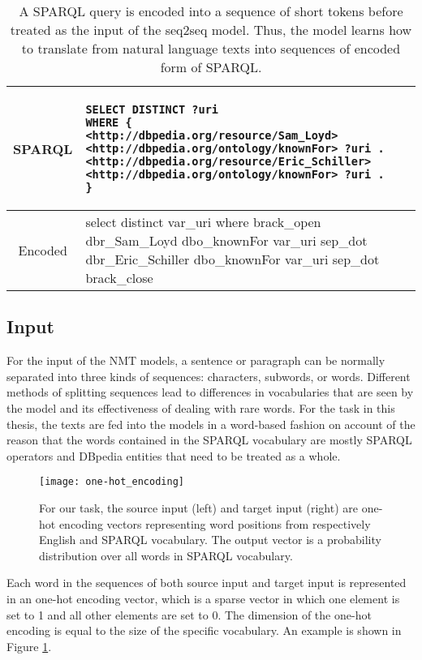 \begin{table}[h]
\begin{tabular}{c | p{}}
SPARQL & \begin{lstlisting}[language=SPARQL]
SELECT DISTINCT ?uri 
WHERE { 
<http://dbpedia.org/resource/Sam_Loyd> <http://dbpedia.org/ontology/knownFor> ?uri .
<http://dbpedia.org/resource/Eric_Schiller> <http://dbpedia.org/ontology/knownFor> ?uri . 
}
\end{lstlisting} \\
\hline
Encoded & {\small select distinct var\_uri where brack\_open dbr\_Sam\_Loyd dbo\_knownFor var\_uri sep\_dot dbr\_Eric\_Schiller dbo\_knownFor var\_uri sep\_dot brack\_close}
\end{tabular}
\caption{A SPARQL query is encoded into a sequence of short tokens before treated as the input of the seq2seq model. Thus, the model learns how to translate from natural language texts into sequences of encoded form of SPARQL.}
\label{table:sparql encoding}
\end{table}



\subsection{Input} \label{subsection:preliminary input}

For the input of the NMT models, a sentence or paragraph can be normally separated into three kinds of sequences: characters, subwords, or words. Different methods of splitting sequences lead to differences in vocabularies that are seen by the model and its effectiveness of dealing with rare words. For the task in this thesis, the texts are fed into the models in a word-based fashion on account of the reason that the words contained in the SPARQL vocabulary are mostly SPARQL operators and DBpedia entities that need to be treated as a whole.

\begin{figure}[h]
\texttt{[image: one-hot\_encoding]}
\centering
\caption{For our task, the source input (left) and target input (right) are one-hot encoding vectors representing word positions from respectively English and SPARQL vocabulary. The output vector is a probability distribution over all words in SPARQL vocabulary.}
\label{figure:one-hot encoding}
\end{figure}

Each word in the sequences of both source input and target input is represented in an one-hot encoding vector, which is a sparse vector in which one element is set to 1 and all other elements are set to 0. The dimension of the one-hot encoding is equal to the size of the specific vocabulary. An example is shown in Figure \ref{figure:one-hot encoding}.

